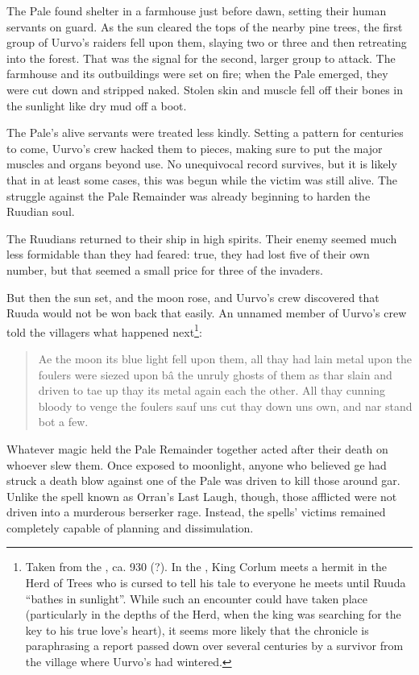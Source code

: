 \documentclass[12pt]{report}
\begin{document}
The Pale found shelter in a farmhouse just before dawn, setting their
human servants on guard.  As the sun cleared the tops of the nearby
pine trees, the first group of Uurvo's raiders fell upon them, slaying
two or three and then retreating into the forest.  That was the signal
for the second, larger group to attack.  The farmhouse and its
outbuildings were set on fire; when the Pale emerged, they were cut
down and stripped naked.  Stolen skin and muscle fell off their bones
in the sunlight like dry mud off a boot.

The Pale's alive servants were treated less kindly.  Setting a pattern
for centuries to come, Uurvo's crew hacked them to pieces, making sure
to put the major muscles and organs beyond use.  No unequivocal record
survives, but it is likely that in at least some cases, this was begun
while the victim was still alive.  The struggle against the Pale
Remainder was already beginning to harden the Ruudian soul.

The Ruudians returned to their ship in high spirits.  Their enemy
seemed much less formidable than they had feared: true, they had lost
five of their own number, but that seemed a small price for three of
the invaders.

But then the sun set, and the moon rose, and Uurvo's crew discovered
that Ruuda would not be won back that easily.  An unnamed member of
Uurvo's crew told the villagers what happened next\footnote{Taken from
the , ca. 930 (?).  In the ,
King Corlum meets a hermit in the Herd of Trees who is cursed to tell
his tale to everyone he meets until Ruuda ``bathes in sunlight''.  While
such an encounter could have taken place (particularly in the depths
of the Herd, when the king was searching for the key to his true
love's heart), it seems more likely that the chronicle is paraphrasing
a report passed down over several centuries by a survivor from the
village where Uurvo's  had wintered.}:

\begin{quotation}
Ae the moon its blue light fell upon them, all thay had lain metal
upon the foulers were siezed upon b\^a the unruly ghosts of them as
thar slain and driven to tae up thay its metal again each the other.
All thay cunning bloody to venge the foulers sauf uns cut thay down
uns own, and nar stand bot a few.
\end{quotation}

Whatever magic held the Pale Remainder together acted after their
death on whoever slew them.  Once exposed to moonlight, anyone who
believed ge had struck a death blow against one of the Pale was driven
to kill those around gar.  Unlike the spell known as Orran's Last
Laugh, though, those afflicted were not driven into a murderous
berserker rage.  Instead, the spells' victims remained completely
capable of planning and dissimulation.
\end{document}
